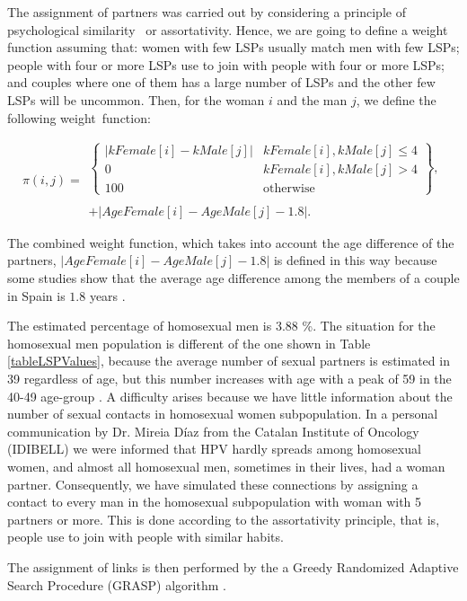 The assignment of partners was carried out by considering a principle of psychological similarity~\cite{gentner1997structure} or assortativity.
Hence, we are going to define a weight function assuming that: women with few LSPs usually match men with few LSPs; people with four or more LSPs use to join with people with four or more LSPs; and couples where one of them has a large number of LSPs and the other few LSPs will be uncommon. Then, for the woman $i$ and the man $j$, we define the following weight~function:

\begin{equation}
\pi(i,j) = 
\begin{array}{l}
\left\lbrace \begin{array}{lc}
| kFemale[i] - kMale[j] | & kFemale[i], kMale[j] \le 4 \\
0 & kFemale[i], kMale[j] > 4 \\
100 & \mbox{otherwise}
\end{array} \right\rbrace, \\
\\
 + | AgeFemale[i] - AgeMale[j] - 1.8 |.
\end{array}
\label{peso}
\end{equation}

The combined weight function, which takes into account the age difference of the partners, $\vert AgeFemale[i] - AgeMale[j] - 1.8 \vert$ is defined in this way because some studies show that the average age difference among the members of a couple in Spain is $1.8$ years \cite{miret2010similitud}. 


The estimated percentage of homosexual men is $3.88$ \%\cite{INE}. The situation for the homosexual men population is different of the one shown in Table \ref{tableLSPValues}, because the average number of sexual partners is estimated in 39 regardless of age, but this number increases with age with a peak of 59 in the 40-49 age-group \cite{Durex2002}.
A difficulty arises because we have little information about the number of sexual contacts in homosexual women subpopulation. In a personal communication by Dr. Mireia D\'iaz from the Catalan Institute of Oncology (IDIBELL) we were informed that HPV hardly spreads among homosexual women, and almost all homosexual men, sometimes in their lives, had a woman partner. Consequently, we have simulated these connections by assigning a contact to every man in the homosexual subpopulation with woman with 5 partners or more. This is done according to the assortativity principle, that is, people use to join with people with similar habits.

The assignment of links is then performed by the a Greedy Randomized Adaptive Search Procedure (GRASP) algorithm \cite{cormen2009introduction,feo1995greedy}. %

